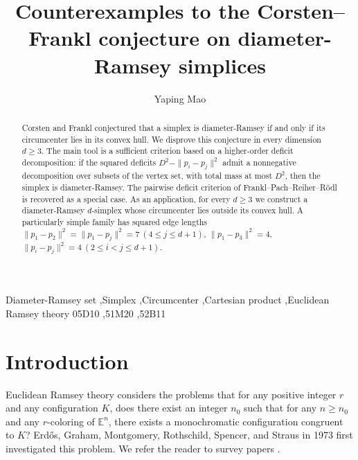 \documentclass[preprint,12pt]{elsarticle}
\theoremstyle{remark}
\begin{document}
\begin{frontmatter}

\title{Counterexamples to the Corsten--Frankl conjecture on diameter-Ramsey simplices}

\author[aff1]{Yaping Mao}

\address[aff1]{Academy of Plateau Science and Sustainability, and School of Mathematics and Statistics, Qinghai Normal University, Xining, Qinghai 810008, China}

\begin{abstract}
Corsten and Frankl conjectured that a simplex is diameter-Ramsey if and only if its circumcenter lies in its convex hull. We disprove this conjecture in every dimension $d\ge 3$. The main tool is a sufficient criterion based on a higher-order deficit decomposition: if the squared deficits $D^2-\|p_i-p_j\|^2$ admit a nonnegative decomposition over subsets of the vertex set, with total mass at most $D^2$, then the simplex is diameter-Ramsey. The pairwise deficit criterion of Frankl--Pach--Reiher--R\"odl is recovered as a special case. As an application, for every $d\ge 3$ we construct a diameter-Ramsey $d$-simplex whose circumcenter lies outside its convex hull. A particularly simple family has squared edge lengths
$\|p_1-p_2\|^2=\|p_1-p_j\|^2=7~ (4\le j\le d+1)$,
$\|p_1-p_3\|^2=4$,
$\|p_i-p_j\|^2=4 ~ (2\le i<j\le d+1)$.
\end{abstract}

\begin{keyword}
Diameter-Ramsey set \sep Simplex \sep Circumcenter \sep Cartesian product \sep Euclidean Ramsey theory
\MSC[2020] 05D10 \sep 51M20 \sep 52B11
\end{keyword}

\end{frontmatter}

\section{Introduction}

\noindent Euclidean Ramsey theory considers
the problems that
for any positive integer $r$ and any configuration $K$,
does there exist an integer $n_0$ such that
for any $n \geq n_0$ and any $r$-coloring of $\mathbb{E}^n$,
there exists a monochromatic configuration congruent to $K$?
Erd\H{o}s, Graham, Montgomery, Rothschild, Spencer, and
Straus \cite{EGMRSS73} in 1973 first
investigated this problem.
We refer the reader to survey papers \cite{GrahamTressler, GrahamOldNew,
GrahamRecentTrend}.
\end{document}
